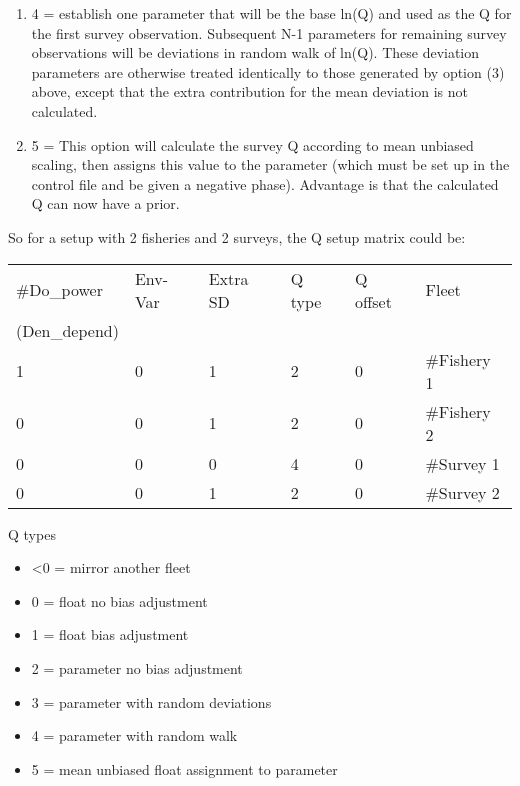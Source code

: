 \begin{enumerate}
\begin{enumerate}
		\item 4 = establish one parameter that will be the base ln(Q) and used as the Q for the first survey observation.  Subsequent N-1 parameters for remaining survey observations will be deviations in random walk of ln(Q).  These deviation parameters are otherwise treated identically to those generated by option (3) above, except that the extra contribution for the mean deviation is not calculated.
		\item 5 = This option will calculate the survey Q according to mean unbiased scaling, then assigns this value to the parameter (which must be set up in the control file and be given a negative phase).  Advantage is that the calculated Q can now have a prior.
	\end{enumerate}
\end{enumerate}

So for a setup with 2 fisheries and 2 surveys, the Q setup matrix could be:

\begin{center}
	\begin{longtable}{p{2.75cm} p{2.75cm} p{2.75cm} p{2cm} p{2cm} p{2cm}}

		\hline
		\endfirsthead

		\hline
		\endhead

		\endfoot
		\endlastfoot
	    \#Do\_power   & Env-Var & Extra SD & Q type & Q offset  & Fleet \\
	    (Den\_depend) &         &          &        &           & \\
	    \hline
	    1 & 0 & 1 & 2 & 0 & \#Fishery 1 \\
	    0 & 0 & 1 & 2 & 0 & \#Fishery 2 \\
	    0 & 0 & 0 & 4 & 0 & \#Survey 1 \\
	    0 & 0 & 1 & 2 & 0 & \#Survey 2 \\
	    \hline
	\end{longtable}
\end{center}

\noindent Q types
\begin{itemize}
	\item <0 = mirror another fleet
	\item 0 = float no bias adjustment
	\item 1 = float bias adjustment
	\item 2 = parameter no bias adjustment
	\item 3 = parameter with random deviations
	\item 4 = parameter with random walk
	\item 5 = mean unbiased float assignment to parameter
\end{itemize}


